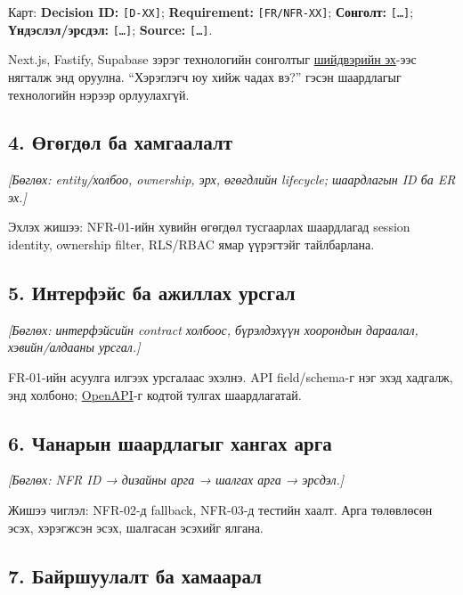 Карт: \textbf{Decision ID:} \nolinkurl{[D-XX]}; \textbf{Requirement:}
\nolinkurl{[FR/NFR-XX]}; \textbf{Сонголт:} \nolinkurl{[…]};
\textbf{Үндэслэл/эрсдэл:} \nolinkurl{[…]}; \textbf{Source:}
\nolinkurl{[…]}.

Next.js, Fastify, Supabase зэрэг технологийн сонголтыг
\href{../../../agent-context/DECISIONS.md}{шийдвэрийн эх}-ээс нягталж
энд оруулна. ``Хэрэглэгч юу хийж чадах вэ?'' гэсэн шаардлагыг
технологийн нэрээр орлуулахгүй.

\subsection{4. Өгөгдөл ба
хамгаалалт}\label{doc6-ux4e9ux433ux4e9ux433ux434ux4e9ux43b-ux431ux430-ux445ux430ux43cux433ux430ux430ux43bux430ux43bux442}

\emph{{[}Бөглөх: entity/холбоо, ownership, эрх, өгөгдлийн lifecycle;
шаардлагын ID ба ER эх.{]}}

Эхлэх жишээ: NFR-01-ийн хувийн өгөгдөл тусгаарлах шаардлагад session
identity, ownership filter, RLS/RBAC ямар үүрэгтэйг тайлбарлана.

\subsection{5. Интерфэйс ба ажиллах
урсгал}\label{doc6-ux438ux43dux442ux435ux440ux444ux44dux439ux441-ux431ux430-ux430ux436ux438ux43bux43bux430ux445-ux443ux440ux441ux433ux430ux43b}

\emph{{[}Бөглөх: интерфэйсийн contract холбоос, бүрэлдэхүүн хоорондын
дараалал, хэвийн/алдааны урсгал.{]}}

FR-01-ийн асуулга илгээх урсгалаас эхэлнэ. API field/schema-г нэг эхэд
хадгалж, энд холбоно; \href{../../phase-0/06-api-spec.yaml}{OpenAPI}-г
кодтой тулгах шаардлагатай.

\subsection{6. Чанарын шаардлагыг хангах
арга}\label{doc6-ux447ux430ux43dux430ux440ux44bux43d-ux448ux430ux430ux440ux434ux43bux430ux433ux44bux433-ux445ux430ux43dux433ux430ux445-ux430ux440ux433ux430}

\emph{{[}Бөглөх: NFR ID → дизайны арга → шалгах арга → эрсдэл.{]}}

Жишээ чиглэл: NFR-02-д fallback, NFR-03-д тестийн хаалт. Арга төлөвлөсөн
эсэх, хэрэгжсэн эсэх, шалгасан эсэхийг ялгана.

\subsection{7. Байршуулалт ба
хамаарал}\label{doc6-ux431ux430ux439ux440ux448ux443ux443ux43bux430ux43bux442-ux431ux430-ux445ux430ux43cux430ux430ux440ux430ux43b}


